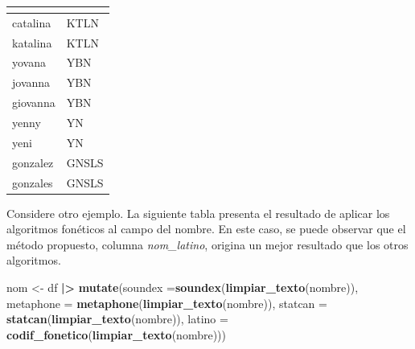 \documentclass[
  12pt,
]{book}
\newenvironment{Shaded}{\begin{snugshade}}{\end{snugshade}}
\newcommand{\AttributeTok}[1]{\textcolor[rgb]{0.13,0.29,0.53}{#1}}
\newcommand{\FunctionTok}[1]{\textcolor[rgb]{0.13,0.29,0.53}{\textbf{#1}}}
\newcommand{\NormalTok}[1]{#1}
\newcommand{\OtherTok}[1]{\textcolor[rgb]{0.56,0.35,0.01}{#1}}
\newcommand{\SpecialCharTok}[1]{\textcolor[rgb]{0.81,0.36,0.00}{\textbf{#1}}}
\begin{document}
\begin{table}[t]
\fontsize{12.0pt}{14.4pt}\selectfont
\begin{tabular*}{\linewidth}{@{\extracolsep{\fill}}ll}
\toprule
{\bfseries \cellcolor[HTML]{F9F9F9}{nombre}} & {\bfseries \cellcolor[HTML]{F9F9F9}{codif}} \\ 
\midrule\addlinespace[2.5pt]
catalina & KTLN \\ 
katalina & KTLN \\ 
yovana & YBN \\ 
jovanna & YBN \\ 
giovanna & YBN \\ 
yenny & YN \\ 
yeni & YN \\ 
gonzalez & GNSLS \\ 
gonzales & GNSLS \\ 
\bottomrule
\end{tabular*}
\end{table}

Considere otro ejemplo. La siguiente tabla presenta el resultado de aplicar los algoritmos fonéticos al campo del nombre. En este caso, se puede observar que el método propuesto, columna \emph{nom\_latino}, origina un mejor resultado que los otros algoritmos.

\begin{Shaded}
\begin{Highlighting}[]
\NormalTok{nom }\OtherTok{\textless{}{-}}\NormalTok{ df }\SpecialCharTok{|\textgreater{}} 
       \FunctionTok{mutate}\NormalTok{(}\AttributeTok{soundex =}\FunctionTok{soundex}\NormalTok{(}\FunctionTok{limpiar\_texto}\NormalTok{(nombre)),}
              \AttributeTok{metaphone =} \FunctionTok{metaphone}\NormalTok{(}\FunctionTok{limpiar\_texto}\NormalTok{(nombre)),}
              \AttributeTok{statcan =} \FunctionTok{statcan}\NormalTok{(}\FunctionTok{limpiar\_texto}\NormalTok{(nombre)),}
              \AttributeTok{latino =} \FunctionTok{codif\_fonetico}\NormalTok{(}\FunctionTok{limpiar\_texto}\NormalTok{(nombre)))}
\end{Highlighting}
\end{Shaded}
\end{document}
